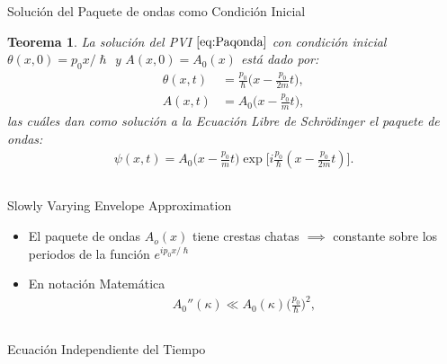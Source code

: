 \documentclass[aspectratio=1610]{beamer}
\newtheorem*{teo}{Teorema}
\begin{document}
\begin{frame}{Solución del Paquete de ondas como Condición Inicial}
   
\begin{teo}
    La solución del PVI $\eqref{eq:Paqonda}$ con condición inicial $\theta(x,0) = p_{0}x/\hslash$ y $A(x,0) = A_{0}(x)$ está dado por:
    \begin{align*}
        \theta(x,t) & = \frac{p_{0}}{\hslash}\bigg(x - \frac{p_{0}}{2m}t\bigg),
        \\
        A(x,t) & = A_{0}\bigg(x-\frac{p_{0}}{m}t\bigg),
    \end{align*}
    las cuáles dan como solución a la Ecuación Libre de Schrödinger el paquete de ondas:
    \begin{align}
        \psi(x,t) = A_{0}\bigg(x-\frac{p_{0}}{m}t\bigg)\exp\bigg[i\frac{p_{0}}{\hslash}(x - \frac{p_{0}}{2m}t)\bigg].
        \label{eq:Apoyo7}
    \end{align}
\end{teo}
    
\begin{columns}
\column{37em}
\end{columns}
\end{frame}

\begin{frame}{Slowly Varying Envelope Approximation}

\begin{itemize}
    \item El paquete de ondas $A_{o}(x)$ tiene crestas chatas $\implies$ constante sobre los periodos de la función $e^{ip_{0}x/\hslash}$
    \vspace{0.1\textheight} 
    \item En notación Matemática
    \begin{align*} 
    A_{0}''(\kappa) \ll A_{0}(\kappa)\bigg(\frac{p_{0}}{\hslash}\bigg)^2,
    \end{align*}
\end{itemize} 
\end{frame}


\begin{frame}
\begin{columns}
\column{37em}
\vspace{1cm}
\Huge{\centerline{Ecuación Independiente del Tiempo}}
\end{columns}
\end{frame}
\end{document}
